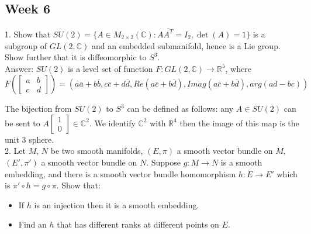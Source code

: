 \documentclass{article}
\theoremstyle{definition}
\begin{document}
\subsection{Week 6}

1. Show that $SU(2)=\{A\in M_{2\times 2}(\mathbb{C}): A\overline{A^T}=I_2, \det(A)=1\}$ is a subgroup of $GL(2, \mathbb{C})$ and an embedded submanifold, hence is a Lie group. Show further that it is diffeomorphic to $S^3$.\\

Answer: $SU(2)$ is a level set of function $F: GL(2, \mathbb{C})\rightarrow \mathbb{R}^5$, where \[F(\left[\begin{array}{cc}a & b\\ c & d\end{array}\right])=(a\bar{a}+b\bar{b}, c\bar{c}+d\bar{d}, Re(a\bar{c}+b\bar{d}), Imag(a\bar{c}+b\bar{d}), arg(ad-bc))\]

The bijection from $SU(2)$ to $S^3$ can be defined as follows: any $A\in SU(2)$ can be sent to $A\left[\begin{array}{c}1\\0\end{array}\right]\in \mathbb{C}^2$. We identify $\mathbb{C}^2$ with $\mathbb{R}^4$ then the image of this map is the unit $3$ sphere.\\

2. Let $M$, $N$ be two smooth manifolds, $(E, \pi)$ a smooth vector bundle on $M$, $(E', \pi')$ a smooth vector bundle on $N$. Suppose $g: M\rightarrow N$ is a smooth embedding, and there is a smooth vector bundle homomorphism $h: E\rightarrow E'$ which is $\pi'\circ h=g\circ \pi$. Show that:

\begin{itemize}
    \item If $h$ is an injection then it is a smooth embedding.
    \item Find an $h$ that has different ranks at different points on $E$.
\end{itemize}
\end{document}
